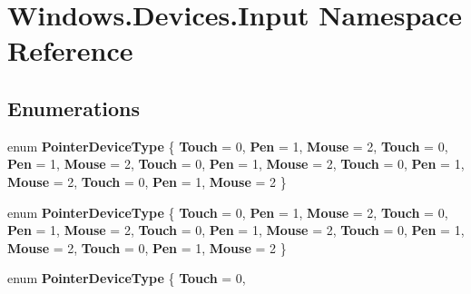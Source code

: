 \hypertarget{namespace_windows_1_1_devices_1_1_input}{}\section{Windows.\+Devices.\+Input Namespace Reference}
\label{namespace_windows_1_1_devices_1_1_input}
\subsection*{Enumerations}
\begin{DoxyCompactItemize}
\item 
\mbox{\label{namespace_windows_1_1_devices_1_1_input_a046eb61df09a21a64ff3d563cd3c46f6}} 
enum {\bfseries Pointer\+Device\+Type} \{ \newline
{\bfseries Touch} = 0, 
{\bfseries Pen} = 1, 
{\bfseries Mouse} = 2, 
{\bfseries Touch} = 0, 
\newline
{\bfseries Pen} = 1, 
{\bfseries Mouse} = 2, 
{\bfseries Touch} = 0, 
{\bfseries Pen} = 1, 
\newline
{\bfseries Mouse} = 2, 
{\bfseries Touch} = 0, 
{\bfseries Pen} = 1, 
{\bfseries Mouse} = 2, 
\newline
{\bfseries Touch} = 0, 
{\bfseries Pen} = 1, 
{\bfseries Mouse} = 2
 \}
\item 
\mbox{\label{namespace_windows_1_1_devices_1_1_input_a046eb61df09a21a64ff3d563cd3c46f6}} 
enum {\bfseries Pointer\+Device\+Type} \{ \newline
{\bfseries Touch} = 0, 
{\bfseries Pen} = 1, 
{\bfseries Mouse} = 2, 
{\bfseries Touch} = 0, 
\newline
{\bfseries Pen} = 1, 
{\bfseries Mouse} = 2, 
{\bfseries Touch} = 0, 
{\bfseries Pen} = 1, 
\newline
{\bfseries Mouse} = 2, 
{\bfseries Touch} = 0, 
{\bfseries Pen} = 1, 
{\bfseries Mouse} = 2, 
\newline
{\bfseries Touch} = 0, 
{\bfseries Pen} = 1, 
{\bfseries Mouse} = 2
 \}
\item 
\mbox{\label{namespace_windows_1_1_devices_1_1_input_a046eb61df09a21a64ff3d563cd3c46f6}} 
enum {\bfseries Pointer\+Device\+Type} \{ \newline
{\bfseries Touch} = 0, 

\end{DoxyCompactItemize}
